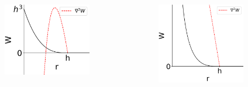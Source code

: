 \documentclass[aspectratio=169]{beamer}
\begin{document}
\begin{frame}
\begin{columns}
\begin{column}{0.45\textwidth}
\begin{figure}
\includegraphics[width=0.9\textwidth]{pictures/laplacian.png}
\end{figure}
\end{column}
\begin{column}{0.45\textwidth}
\begin{figure}
\includegraphics[width=0.9\textwidth]{pictures/laplacian1.png}
\end{figure}
\end{column}
\end{columns}
\end{frame}
\end{document}
